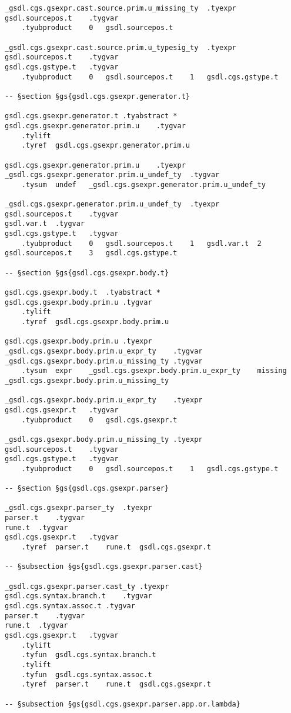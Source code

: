 \documentclass{report}
\begin{document}
\begin{verbatim}
_gsdl.cgs.gsexpr.cast.source.prim.u_missing_ty	.tyexpr
gsdl.sourcepos.t	.tygvar
	.tyubproduct	0	gsdl.sourcepos.t

_gsdl.cgs.gsexpr.cast.source.prim.u_typesig_ty	.tyexpr
gsdl.sourcepos.t	.tygvar
gsdl.cgs.gstype.t	.tygvar
	.tyubproduct	0	gsdl.sourcepos.t	1	gsdl.cgs.gstype.t

-- §section §gs{gsdl.cgs.gsexpr.generator.t}

gsdl.cgs.gsexpr.generator.t	.tyabstract	*
gsdl.cgs.gsexpr.generator.prim.u	.tygvar
	.tylift
	.tyref	gsdl.cgs.gsexpr.generator.prim.u

gsdl.cgs.gsexpr.generator.prim.u	.tyexpr
_gsdl.cgs.gsexpr.generator.prim.u_undef_ty	.tygvar
	.tysum	undef	_gsdl.cgs.gsexpr.generator.prim.u_undef_ty

_gsdl.cgs.gsexpr.generator.prim.u_undef_ty	.tyexpr
gsdl.sourcepos.t	.tygvar
gsdl.var.t	.tygvar
gsdl.cgs.gstype.t	.tygvar
	.tyubproduct	0	gsdl.sourcepos.t	1	gsdl.var.t	2	gsdl.sourcepos.t	3	gsdl.cgs.gstype.t

-- §section §gs{gsdl.cgs.gsexpr.body.t}

gsdl.cgs.gsexpr.body.t	.tyabstract	*
gsdl.cgs.gsexpr.body.prim.u	.tygvar
	.tylift
	.tyref	gsdl.cgs.gsexpr.body.prim.u

gsdl.cgs.gsexpr.body.prim.u	.tyexpr
_gsdl.cgs.gsexpr.body.prim.u_expr_ty	.tygvar
_gsdl.cgs.gsexpr.body.prim.u_missing_ty	.tygvar
	.tysum	expr	_gsdl.cgs.gsexpr.body.prim.u_expr_ty	missing	_gsdl.cgs.gsexpr.body.prim.u_missing_ty

_gsdl.cgs.gsexpr.body.prim.u_expr_ty	.tyexpr
gsdl.cgs.gsexpr.t	.tygvar
	.tyubproduct	0	gsdl.cgs.gsexpr.t

_gsdl.cgs.gsexpr.body.prim.u_missing_ty	.tyexpr
gsdl.sourcepos.t	.tygvar
gsdl.cgs.gstype.t	.tygvar
	.tyubproduct	0	gsdl.sourcepos.t	1	gsdl.cgs.gstype.t

-- §section §gs{gsdl.cgs.gsexpr.parser}

_gsdl.cgs.gsexpr.parser_ty	.tyexpr
parser.t	.tygvar
rune.t	.tygvar
gsdl.cgs.gsexpr.t	.tygvar
	.tyref	parser.t	rune.t	gsdl.cgs.gsexpr.t

-- §subsection §gs{gsdl.cgs.gsexpr.parser.cast}

_gsdl.cgs.gsexpr.parser.cast_ty	.tyexpr
gsdl.cgs.syntax.branch.t	.tygvar
gsdl.cgs.syntax.assoc.t	.tygvar
parser.t	.tygvar
rune.t	.tygvar
gsdl.cgs.gsexpr.t	.tygvar
	.tylift
	.tyfun	gsdl.cgs.syntax.branch.t
	.tylift
	.tyfun	gsdl.cgs.syntax.assoc.t
	.tyref	parser.t	rune.t	gsdl.cgs.gsexpr.t

-- §subsection §gs{gsdl.cgs.gsexpr.parser.app.or.lambda}


\end{verbatim}
\end{document}
